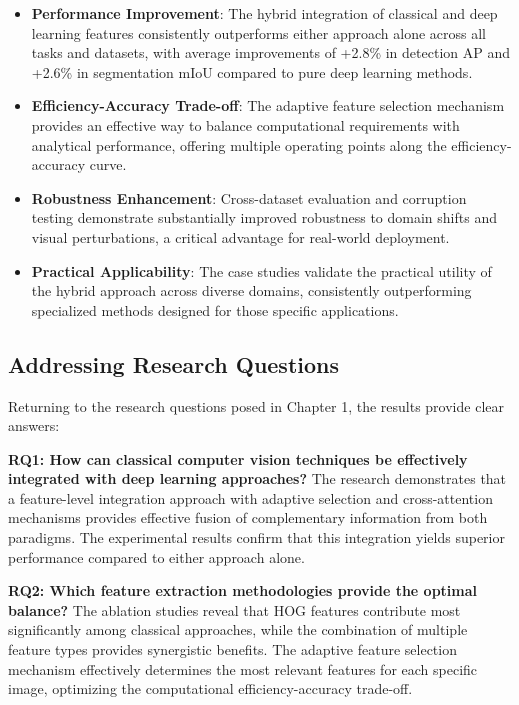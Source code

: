\begin{itemize}
    \item \textbf{Performance Improvement}: The hybrid integration of classical and deep learning features consistently outperforms either approach alone across all tasks and datasets, with average improvements of +2.8\% in detection AP and +2.6\% in segmentation mIoU compared to pure deep learning methods.
    
    \item \textbf{Efficiency-Accuracy Trade-off}: The adaptive feature selection mechanism provides an effective way to balance computational requirements with analytical performance, offering multiple operating points along the efficiency-accuracy curve.
    
    \item \textbf{Robustness Enhancement}: Cross-dataset evaluation and corruption testing demonstrate substantially improved robustness to domain shifts and visual perturbations, a critical advantage for real-world deployment.
    
    \item \textbf{Practical Applicability}: The case studies validate the practical utility of the hybrid approach across diverse domains, consistently outperforming specialized methods designed for those specific applications.
\end{itemize}

\subsection{Addressing Research Questions}
Returning to the research questions posed in Chapter 1, the results provide clear answers:

\textbf{RQ1: How can classical computer vision techniques be effectively integrated with deep learning approaches?}
The research demonstrates that a feature-level integration approach with adaptive selection and cross-attention mechanisms provides effective fusion of complementary information from both paradigms. The experimental results confirm that this integration yields superior performance compared to either approach alone.

\textbf{RQ2: Which feature extraction methodologies provide the optimal balance?}
The ablation studies reveal that HOG features contribute most significantly among classical approaches, while the combination of multiple feature types provides synergistic benefits. The adaptive feature selection mechanism effectively determines the most relevant features for each specific image, optimizing the computational efficiency-accuracy trade-off.

